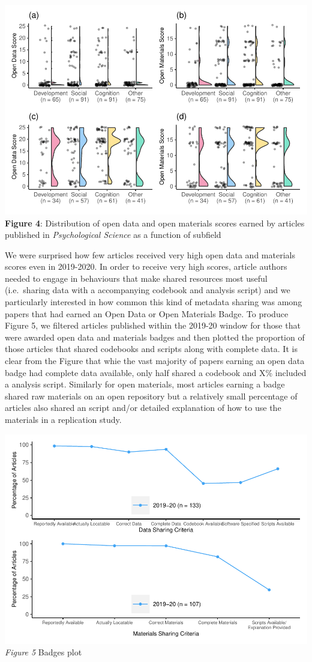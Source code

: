 \documentclass[
  english,
  man,floatsintext]{apa6}
\begin{document}
\includegraphics{icd_special_issue_files/figure-latex/rain_combo-1.pdf}
\textbf{Figure 4}: Distribution of open data and open materials scores earned by articles published in \emph{Psychological Science} as a function of subfield

We were surprised how few articles received very high open data and materials scores even in 2019-2020. In order to receive very high scores, article authors needed to engage in behaviours that make shared resources most useful (i.e.~sharing data with a accompanying codebook and analysis script) and we particularly interested in how common this kind of metadata sharing was among papers that had earned an Open Data or Open Materials Badge. To produce Figure 5, we filtered articles published within the 2019-20 window for those that were awarded open data and materials badges and then plotted the proportion of those articles that shared codebooks and scripts along with complete data. It is clear from the Figure that whie the vast majority of papers earning an open data badge had complete data available, only half shared a codebook and X\% included a analysis script. Similarly for open materials, most articles earning a badge shared raw materials on an open repository but a relatively small percentage of articles also shared an script and/or detailed explanation of how to use the materials in a replication study.

\includegraphics{icd_special_issue_files/figure-latex/unnamed-chunk-4-1.pdf}
\emph{Figure 5} Badges plot
\end{document}
